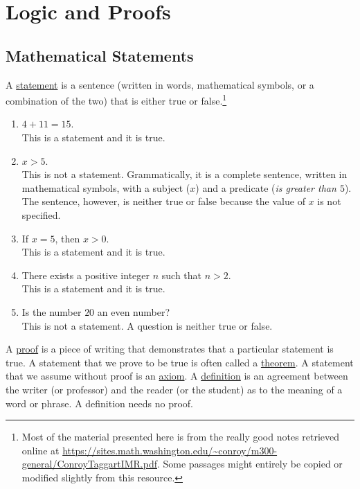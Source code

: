 \chapter{Logic and Proofs}%


\section{Mathematical Statements}

A \underline{statement} is a sentence (written in words, mathematical symbols, or a combination of the two) that is either true or false.\footnote{Most of the material presented here is from the really good notes retrieved online at \url{https://sites.math.washington.edu/~conroy/m300-general/ConroyTaggartIMR.pdf}. Some passages might entirely be copied or modified slightly from this resource.}

\begin{example}
\begin{enumerate}[label=\alph*)]
\item $4 + 11 = 15$. \\This is a statement and it is true.
\item $x > 5$.\\ This is not a statement. Grammatically, it is a complete sentence, written in mathematical symbols, with a subject ($x$) and a predicate (\textit{is greater than $5$}). The sentence, however, is neither true or false because the value of $x$ is not specified.
\item If $x = 5$, then $x > 0$. \\This is a statement and it is true.
\item There exists a positive integer $n$ such that $n > 2$.\\ This is a statement and it is true.
\item Is the number $20$ an even number? \\This is not a statement. A question is neither true or false.
\end{enumerate}
\end{example}

A \underline{proof} is a piece of writing that demonstrates that a particular statement is true. A statement that we prove to be true is often called a \underline{theorem}. A statement that we assume without proof is an \underline{axiom}. A \underline{definition} is an agreement between the writer (or professor) and the reader (or the student) as to the meaning of a word or phrase. A definition needs no proof.



